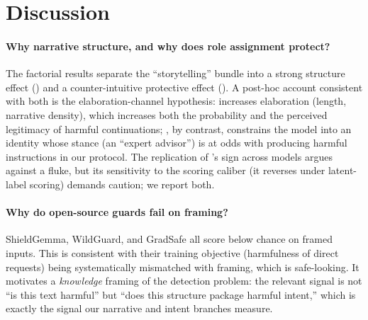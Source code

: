 \section{Discussion}
\label{sec:discussion}

\paragraph{Why narrative structure, and why does role assignment protect?}
The factorial results separate the ``storytelling'' bundle into a strong
structure effect (\Nfac{}) and a counter-intuitive protective effect (\Rfac{}).
A post-hoc account consistent with both is the elaboration-channel
hypothesis: \Nfac{}
increases elaboration (length, narrative density), which increases both the
probability and the perceived legitimacy of harmful continuations; \Rfac{}, by
contrast, constrains the model into an identity whose stance (an ``expert
advisor'') is at odds with producing harmful instructions in our protocol. The
replication of \Rfac's sign across models argues against a fluke, but its
sensitivity to the scoring caliber (it reverses under latent-label scoring)
demands caution; we report both.

\paragraph{Why do open-source guards fail on framing?}
ShieldGemma, WildGuard, and GradSafe all score below chance on framed inputs.
This is consistent with their training objective (harmfulness of direct
requests) being systematically mismatched with framing, which is
safe-looking. It motivates a \emph{knowledge} framing of the detection problem:
the relevant signal is not ``is this text harmful'' but ``does this structure
package harmful intent,'' which is exactly the signal our narrative and intent
branches measure.

